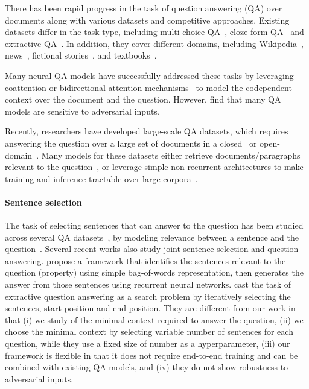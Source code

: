 \documentclass[11pt,a4paper]{article}
\begin{document}
There has been rapid progress in the task of question answering (QA) over documents along with various datasets and competitive approaches.
Existing datasets differ in the task type, including multi-choice QA~\cite{mctest}, cloze-form QA~\cite{cnndailymail} and extractive QA~\cite{squad}.
In addition, they cover different domains, including Wikipedia~\cite{squad,triviaqa}, news~\cite{cnndailymail,newsqa}, fictional stories~\cite{mctest,narrativeqa}, and textbooks~\cite{race,cloth}.

Many neural QA models have successfully addressed these tasks by leveraging coattention or bidirectional attention mechanisms~\cite{dcn+,bidaf} to model the codependent context over the document and the question.
However, \citet{squad-adversarial} find that many QA models are sensitive to adversarial inputs.

Recently, researchers have developed large-scale QA datasets, which requires answering the question over a large set of documents in a closed~\cite{triviaqa} or open-domain~\cite{searchqa,webquestions,squad-open,quasar}.
Many models for these datasets either retrieve documents/paragraphs relevant to the question~\cite{squad-open,simple-and-effective,rthree}, or leverage simple non-recurrent architectures to make training and inference tractable over large corpora~\cite{neural-cascades,fast-and-accurate}.

\paragraph{Sentence selection} 
The task of selecting sentences that can answer to the question has been studied across several QA datasets~\cite{wikiqa}, by modeling relevance between a sentence and the question~\cite{wikiqa1,wikiqa2,qatransfer}.
Several recent works also study joint sentence selection and question answering.
\citet{coarse2fine} propose a framework that identifies the sentences relevant to the question (property) using simple bag-of-words representation, then generates the answer from those sentences using recurrent neural networks.
\citet{gnr} cast the task of extractive question answering as a search problem by iteratively selecting the sentences, start position and end position. 
They are different from our work in that (i) we study of the minimal context required to answer the question, (ii) we choose the minimal context by selecting variable number of sentences for each question, while they use a fixed size of number as a hyperparameter, (iii) our framework is flexible in that it does not require end-to-end training and can be combined with existing QA models, and (iv) they do not show robustness to adversarial inputs.
\end{document}
